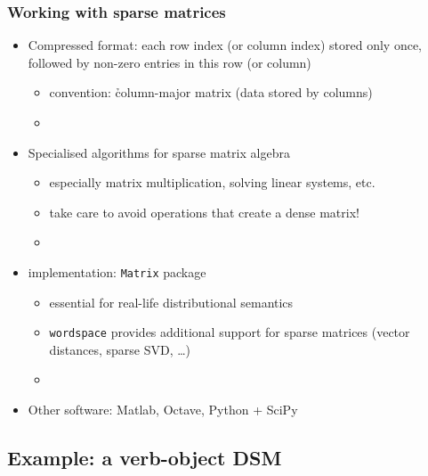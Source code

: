 \documentclass[t]{beamer} %
\begin{document}
\begin{frame}
  \frametitle{Working with sparse matrices}

  \begin{itemize}
  \item Compressed format: each row index (or column index) stored only once,
    followed by non-zero entries in this row (or column)%
    \begin{itemize}
    \item convention: \h{column-major} matrix (data stored by columns)
    \item[]
    \end{itemize}
  \item Specialised algorithms for sparse matrix algebra
    \begin{itemize}
    \item especially matrix multiplication, solving linear systems, etc.
    \item take care to avoid operations that create a dense matrix!
    \item[]
    \end{itemize}
  \item<2->  implementation: \texttt{Matrix} package
    \begin{itemize}
    \item essential for real-life distributional semantics
    \item \texttt{wordspace} provides additional support for sparse matrices (vector distances, sparse SVD, \ldots)
    \item[]
    \end{itemize}
  \item<2-> Other software: Matlab, Octave, Python + SciPy
  \end{itemize}
\end{frame}

\subsection{Example: a verb-object DSM}
\end{document}
